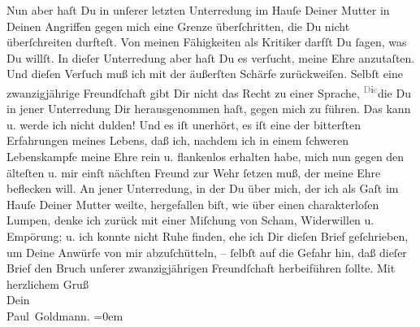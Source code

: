 \begin{ledgroupsized}[t]{13cm}
           \pstart
           Nun aber haſt Du in unſerer letzten Unterredung im Hauſe Deiner Mutter in Deinen Angriffen gegen mich eine Grenze
               überſchritten, die Du {\pb}nicht überſchreiten
               durfteſt. Von meinen Fähigkeiten als Kritiker darfſt Du ſagen, was Du willſt. In
               dieſer Unterredung aber haſt Du es verſucht, meine Ehre anzutaſten. Und dieſen
               Verſuch muß ich mit der äußerſten Schärfe zurückweiſen.  Selbſt eine zwanzigjährige Freundſchaft gibt
               Dir nicht das Recht zu einer Sprache, \substVorne{}\textsuperscript{\textcolor{gray}{D}i\textcolor{gray}{e}}\substDazwischen{}die\substHinten{} Du in jener Unterredung Dir herausgenommen haſt, gegen mich zu führen. Das
               kann u. werde ich nicht {\pb}dulden! Und es iſt  unerhört, es iſt eine der bitterſten Erfahrungen
               meines Lebens, daß ich, nachdem ich in einem ſchweren Lebenskampfe meine Ehre rein u.
               flankenlos erhalten habe, mich nun gegen den älteſten u. mir einſt nächſten Freund
               zur Wehr ſetzen  muß, der meine Ehre \strikeout{\textcolor{gray}{bef}} beflecken will. An jener Unterredung, in der  Du über mich, der ich als Gaſt im Hauſe Deiner Mutter weilte, {\pb}\strikeout{\textcolor{gray}{×}\-\textcolor{gray}{×}\-\textcolor{gray}{×}\-\textcolor{gray}{×}\-\textcolor{gray}{×}\-\textcolor{gray}{×}} hergefallen biſt, wie über einen charakterloſen Lumpen, denke ich zurück mit
               einer Miſchung von Scham, Widerwillen u. Empörung; u. ich konnte nicht Ruhe finden,
               ehe ich Dir dieſen Brief geſchrieben, um Deine Anwürfe von mir abzuſchütteln, –
               ſelbſt auf die Gefahr hin, daß dieſer Brief den Bruch unſerer zwanzigjährigen
               Freundſchaft herbeiführen ſollte.\pend
           \pstart
           {\pb}Mit herzlichem Gruß {\\[\baselineskip]}Dein {\\[\baselineskip]}\spacefill\mbox{Paul Goldmann.}\pend
           \leftskip=0em{}
         
         \endnumbering{}\end{ledgroupsized}  \newcommand{\dateiname}{L03475}\newcommand{\titel}{Paul Goldmann an Arthur Schnitzler, 13. 1. 1911}\newcommand{\editorInnen}{Martin Anton Müller und Laura Untner}
      